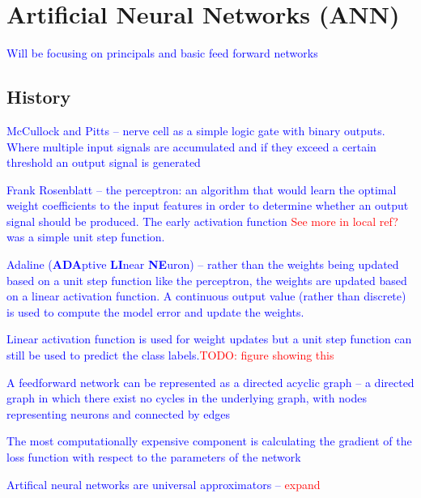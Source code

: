 \section{Artificial Neural Networks (ANN)}

\textcolor{blue}{Will be focusing on principals and basic feed forward networks}

\subsection{History}

\textcolor{blue}{McCullock and Pitts -- nerve cell as a simple logic gate with binary outputs.  Where multiple input signals are accumulated and if they exceed a certain threshold an output signal is generated}

\textcolor{blue}{Frank Rosenblatt -- the perceptron: an algorithm that would learn the optimal weight coefficients to the input features in order to determine whether an output signal should be produced. The early activation function \textcolor{red}{See more in local ref?} was a simple unit step function.}

\textcolor{blue}{Adaline (\textbf{ADA}ptive \textbf{LI}near \textbf{NE}uron) -- rather than the weights being updated based on a unit step function like the perceptron, the weights are updated based on a linear activation function. A continuous output value (rather than discrete) is used to compute the model error and update the weights.}

\textcolor{blue}{Linear activation function is used for weight updates but a unit step function can still be used to predict the class labels.\textcolor{red}{TODO: figure showing this}}

\textcolor{blue}{A feedforward network can be represented as a directed acyclic graph -- a directed graph in which there exist no cycles in the underlying graph, with nodes representing neurons and connected by edges}

\textcolor{blue}{The most computationally expensive component is calculating the gradient of the loss function with respect to the parameters of the network}

\textcolor{blue}{Artifical neural networks are {universal approximators} -- \textcolor{red}{expand}}